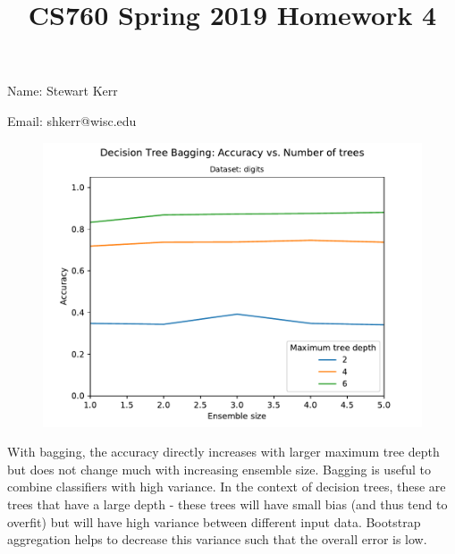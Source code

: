 \documentclass{article}
\title{CS760 Spring 2019 Homework 4}
\author{}
\date{}
\begin{document}
\maketitle



Name: Stewart Kerr

Email: shkerr@wisc.edu 



\begin{figure}[h]
\centering
\includegraphics[scale=1]{bagged_tree_plot}
\end{figure}

With bagging, the accuracy directly increases with larger maximum tree depth but does not change much with increasing ensemble size. Bagging is useful to combine classifiers with high variance. In the context of decision trees, these are trees that have a large depth - these trees will have small bias (and thus tend to overfit) but will have high variance between different input data. Bootstrap aggregation helps to decrease this variance such that the overall error is low.

\pagebreak
\end{document}
